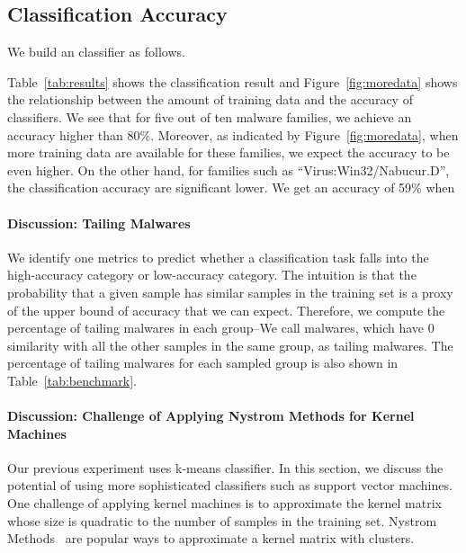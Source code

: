 \subsection{Classification Accuracy}

We build an classifier as follows. 

Table~\ref{tab:results} shows the classification
result and Figure~\ref{fig:moredata} shows
the relationship between the amount of
training data and the accuracy of classifiers. 
We see that for five out of ten 
malware families, we achieve an accuracy
higher than 80\%. Moreover, as indicated
by Figure~\ref{fig:moredata}, when more
training data are available for these
families, we expect the accuracy to be even
higher. On the other hand, for
families such as ``Virus:Win32/Nabucur.D'',
the classification accuracy are significant
lower. We get an accuracy of 59\% when

\paragraph*{Discussion: Tailing Malwares}

We identify one metrics to predict whether
a classification task falls into the
high-accuracy category or low-accuracy
category. The intuition is that the probability
that a given sample has similar samples in
the training set is a proxy of the upper bound
of accuracy that we can expect. Therefore,
we compute the percentage of tailing malwares in each group--We call malwares, which have 0 similarity with all the other samples in the same group, as tailing malwares. 
The percentage of tailing malwares for each sampled group is also shown in Table~\ref{tab:benchmark}. 


\paragraph*{Discussion: Challenge of Applying Nystrom Methods for Kernel Machines}



Our previous experiment uses k-means classifier.
In this section, we discuss the potential of using
more sophisticated classifiers such as
support vector machines. One challenge
of applying kernel machines is to
approximate the kernel matrix whose
size is quadratic to the number of samples
in the training set. Nystrom Methods~\cite{clustering-purpose} are popular ways to
approximate a kernel matrix with clusters.

